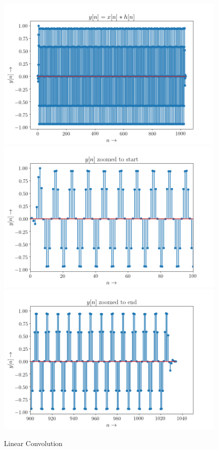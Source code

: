 \documentclass[11pt, a4paper]{article}
\begin{document}
\begin{figure}[!tbh]
  \centering
  \includegraphics[scale=0.4]{./../Extras/a10-5.png}  %
  \includegraphics[scale=0.4]{./../Extras/a10-6.png}  %
  \includegraphics[scale=0.4]{./../Extras/a10-7.png}  %
  \caption{Linear Convolution}
\end{figure}
\end{document}
